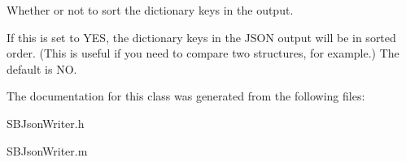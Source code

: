 \-Whether or not to sort the dictionary keys in the output. 

\-If this is set to \-Y\-E\-S, the dictionary keys in the \-J\-S\-O\-N output will be in sorted order. (\-This is useful if you need to compare two structures, for example.) \-The default is \-N\-O. 

\-The documentation for this class was generated from the following files\-:\begin{DoxyCompactItemize}
\item 
\-S\-B\-Json\-Writer.\-h\item 
\-S\-B\-Json\-Writer.\-m\end{DoxyCompactItemize}
